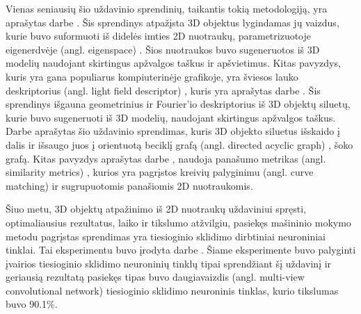 Vienas seniausių šio uždavinio sprendinių, taikantis tokią metodologiją, yra aprašytas darbe \cite{prevWparEig}. Šis sprendinys atpažįsta 3D objektus lygindamas jų vaizdus, kurie buvo suformuoti iš didelės imties 2D nuotraukų, parametrizuotoje 
eigenerdvėje (angl. eigenspace) %
. Šios nuotraukos buvo sugeneruotos iš 3D modelių naudojant skirtingus apžvalgos taškus ir apšvietimus. 
Kitas pavyzdys, kuris yra gana populiarus kompiuterinėje grafikoje, yra 
šviesos lauko deskriptorius (angl. light field descriptor)%
, kuris yra aprašytas darbe \cite{prevWLightFld}. Šis sprendinys išgauna geometrinius ir 
Fourier'io %
deskriptorius iš 3D objektų siluetų, kurie buvo sugeneruoti iš 3D modelių, naudojant skirtingus apžvalgos taškus. 
Darbe \cite{prevWShockGraph} aprašytas šio uždavinio sprendimas, kuris 3D objekto siluetus išskaido į dalis ir išsaugo juos į 
orientuotą beciklį grafą (angl. directed acyclic graph) %
, šoko grafą. %
Kitas pavyzdys aprašytas darbe \cite{prevWSimMet}, naudoja panašumo metrikas (angl. similarity metrics) %
, kurios yra pagrįstos kreivių palyginimu (angl. curve matching)%
ir sugrupuotomis panašiomis 2D nuotraukomis.

Šiuo metu, 3D objektų atpažinimo iš 2D nuotraukų uždaviniui spręsti, optimaliausius  rezultatus, laiko ir tikslumo atžvilgiu, pasiekęs mašininio mokymo metodu pagrįstas sprendimas yra tiesioginio sklidimo dirbtiniai neuroniniai tinklai. Tai eksperimentu buvo įrodyta darbe \cite{cnnExp1}. Šiame eksperimente buvo palyginti įvairios tiesioginio sklidimo neuroninių tinklų tipai sprendžiant šį uždavinį ir geriausią rezultatą pasiekęs tipas buvo
daugiavaizdis (angl. multi-view convolutional network)%
tiesioginio sklidimo neuroninis tinklas, kurio tikslumas buvo 90.1\%.